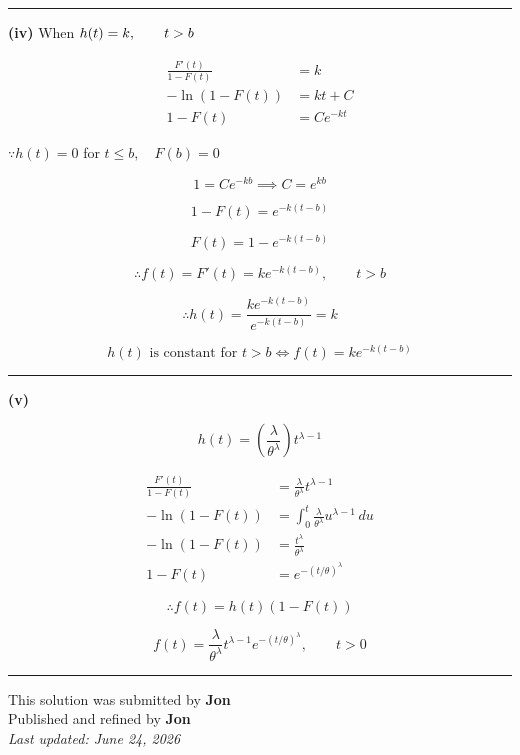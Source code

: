 \documentclass[12pt]{article}
\begin{document}
\bigskip\hrule\bigskip

\textbf{(iv)} When $\displaystyle h(t)=k,\qquad t>b$

\begin{align*}
\frac{F'(t)}{1-F(t)}&=k\\
-\ln(1-F(t))&=kt+C\\
1-F(t)&=Ce^{-kt}
\end{align*}

$\because h(t)=0$ for $t\leq b,\quad F(b)=0$

$$1=Ce^{-kb}\implies C=e^{kb}$$

$$1-F(t)=e^{-k(t-b)}$$

$$F(t)=1-e^{-k(t-b)}$$

$$\therefore f(t)=F'(t)=ke^{-k(t-b)},\qquad t>b$$

$$\therefore h(t)=\frac{ke^{-k(t-b)}}{e^{-k(t-b)}}=k$$

$$ \boxed{h(t)\text{ is constant for }t>b\iff f(t)=ke^{-k(t-b)}}$$

\bigskip\hrule\bigskip

\textbf{(v)}

$$h(t)=\left(\frac{\lambda}{\theta^\lambda}\right)t^{\lambda-1}$$

\begin{align*}
\frac{F'(t)}{1-F(t)}&=\frac{\lambda}{\theta^\lambda}t^{\lambda-1}\\
-\ln(1-F(t))&=\int_0^t \frac{\lambda}{\theta^\lambda}u^{\lambda-1}\,du\\
-\ln(1-F(t))&=\frac{t^\lambda}{\theta^\lambda}\\
1-F(t)&=e^{-(t/\theta)^\lambda}
\end{align*}

$$\therefore f(t)=h(t)(1-F(t))$$

$$ \boxed{f(t)=\frac{\lambda}{\theta^\lambda}t^{\lambda-1}e^{-(t/\theta)^\lambda},\qquad t>0}$$

\bigskip
\hrule
\begin{center}
    This solution was submitted by \textbf{Jon}\\[4pt]
    Published and refined by \textbf{Jon}\\[8pt]
    \textit{Last updated: June 24, 2026}
\end{center}
\end{document}
